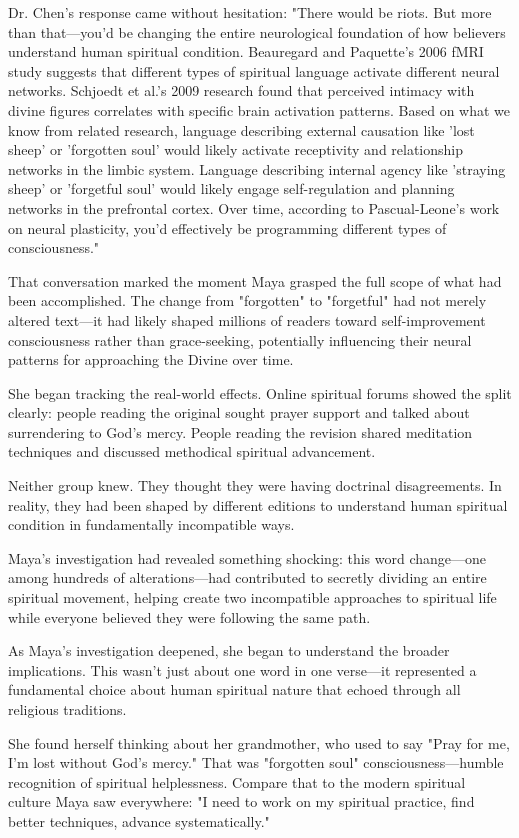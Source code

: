 \documentclass[12pt,twoside]{book}
\begin{document}
Dr. Chen's response came without hesitation: "There would be riots. But more than that—you'd be changing the entire neurological foundation of how believers understand human spiritual condition. Beauregard and Paquette's 2006 fMRI study suggests that different types of spiritual language activate different neural networks. Schjoedt et al.'s 2009 research found that perceived intimacy with divine figures correlates with specific brain activation patterns. Based on what we know from related research, language describing external causation like 'lost sheep' or 'forgotten soul' would likely activate receptivity and relationship networks in the limbic system. Language describing internal agency like 'straying sheep' or 'forgetful soul' would likely engage self-regulation and planning networks in the prefrontal cortex. Over time, according to Pascual-Leone's work on neural plasticity, you'd effectively be programming different types of consciousness."

That conversation marked the moment Maya grasped the full scope of what had been accomplished. The change from "forgotten" to "forgetful" had not merely altered text—it had likely shaped millions of readers toward self-improvement consciousness rather than grace-seeking, potentially influencing their neural patterns for approaching the Divine over time.

She began tracking the real-world effects. Online spiritual forums showed the split clearly: people reading the original sought prayer support and talked about surrendering to God's mercy. People reading the revision shared meditation techniques and discussed methodical spiritual advancement.

Neither group knew. They thought they were having doctrinal disagreements. In reality, they had been shaped by different editions to understand human spiritual condition in fundamentally incompatible ways.

Maya's investigation had revealed something shocking: this word change—one among hundreds of alterations—had contributed to secretly dividing an entire spiritual movement, helping create two incompatible approaches to spiritual life while everyone believed they were following the same path.

As Maya's investigation deepened, she began to understand the broader implications. This wasn't just about one word in one verse—it represented a fundamental choice about human spiritual nature that echoed through all religious traditions.

She found herself thinking about her grandmother, who used to say "Pray for me, I'm lost without God's mercy." That was "forgotten soul" consciousness—humble recognition of spiritual helplessness. Compare that to the modern spiritual culture Maya saw everywhere: "I need to work on my spiritual practice, find better techniques, advance systematically."
\end{document}
